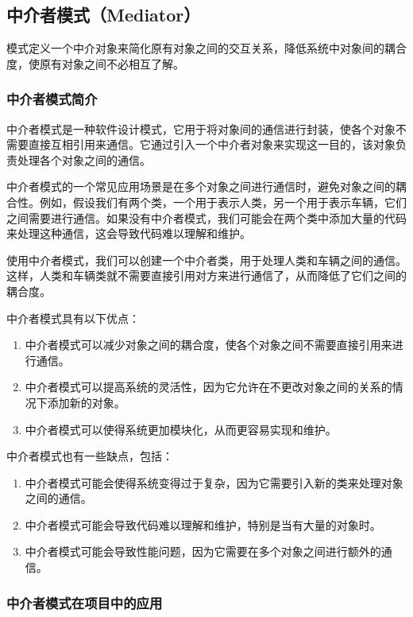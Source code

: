 \subsection{中介者模式（Mediator）}

模式定义一个中介对象来简化原有对象之间的交互关系，降低系统中对象间的耦合度，使原有对象之间不必相互了解。

\subsubsection{中介者模式简介}

中介者模式是一种软件设计模式，它用于将对象间的通信进行封装，使各个对象不需要直接互相引用来通信。它通过引入一个中介者对象来实现这一目的，该对象负责处理各个对象之间的通信。

中介者模式的一个常见应用场景是在多个对象之间进行通信时，避免对象之间的耦合性。例如，假设我们有两个类，一个用于表示人类，另一个用于表示车辆，它们之间需要进行通信。如果没有中介者模式，我们可能会在两个类中添加大量的代码来处理这种通信，这会导致代码难以理解和维护。

使用中介者模式，我们可以创建一个中介者类，用于处理人类和车辆之间的通信。这样，人类和车辆类就不需要直接引用对方来进行通信了，从而降低了它们之间的耦合度。

中介者模式具有以下优点：
\begin{enumerate}
\item 中介者模式可以减少对象之间的耦合度，使各个对象之间不需要直接引用来进行通信。
\item 中介者模式可以提高系统的灵活性，因为它允许在不更改对象之间的关系的情况下添加新的对象。
\item 中介者模式可以使得系统更加模块化，从而更容易实现和维护。
\end{enumerate}

中介者模式也有一些缺点，包括：
\begin{enumerate}
\item 中介者模式可能会使得系统变得过于复杂，因为它需要引入新的类来处理对象之间的通信。
\item 中介者模式可能会导致代码难以理解和维护，特别是当有大量的对象时。
\item 中介者模式可能会导致性能问题，因为它需要在多个对象之间进行额外的通信。
\end{enumerate}

\subsubsection{中介者模式在项目中的应用}


